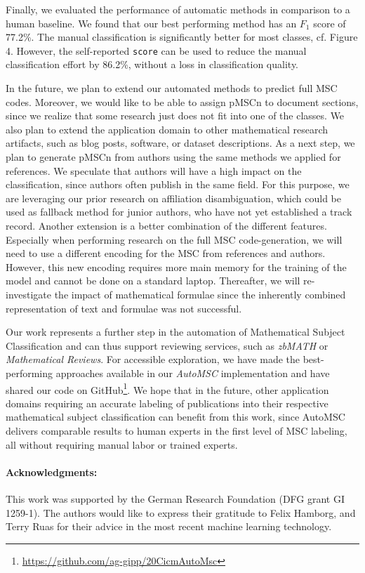 Finally, we evaluated the performance of automatic methods in comparison to a human baseline.
We found that our best performing method has an $F_1$ score of 77.2\%.
The manual classification is significantly better for most classes, cf. Figure 4.
However, the self-reported \texttt{score} can be used to reduce the manual classification effort by 86.2\%, without a loss in classification quality.

In the future, we plan to extend our automated methods to predict full MSC codes.
Moreover, we would like to be able to assign pMSCn to document sections, since we realize that some research just does not fit into one of the classes.
We also plan to extend the application domain to other mathematical research artifacts, such as blog posts, software, or dataset descriptions.
As a next step, we plan to generate pMSCn from authors using the same methods we applied for references.
We speculate that authors will have a high impact on the classification, since authors often publish in the same field.
For this purpose, we are leveraging our prior research on affiliation disambiguation, which could be used as fallback method for junior authors, who have not yet established a track record.
Another extension is a better combination of the different features.
Especially when performing research on the full MSC code-generation, we will need to use a different encoding for the MSC from references and authors.
However, this new encoding requires more main memory for the training of the model and cannot be done on a standard laptop.
Thereafter, we will re-investigate the impact of mathematical formulae since the inherently combined representation of text and formulae was not successful.

Our work represents a further step in the automation of Mathematical Subject Classification and can thus support reviewing services, such as \emph{zbMATH} or \emph{Mathematical Reviews}.
For accessible exploration, we have made the best-performing approaches available in our \emph{AutoMSC} implementation and have shared our code on GitHub\footnote{\url{https://github.com/ag-gipp/20CicmAutoMsc}}.
We hope that in the future, other application domains requiring an accurate labeling of publications into their respective mathematical subject classification can benefit from this work, since AutoMSC delivers comparable results to human experts in the first level of MSC labeling, all without requiring manual labor or trained experts.

\paragraph{Acknowledgments:} This work was supported by the German Research Foundation (DFG grant GI 1259-1).
The authors would like to express their gratitude to Felix Hamborg, and Terry Ruas for their advice in the most recent machine learning technology.
\printbibliography[keyword=primary]

